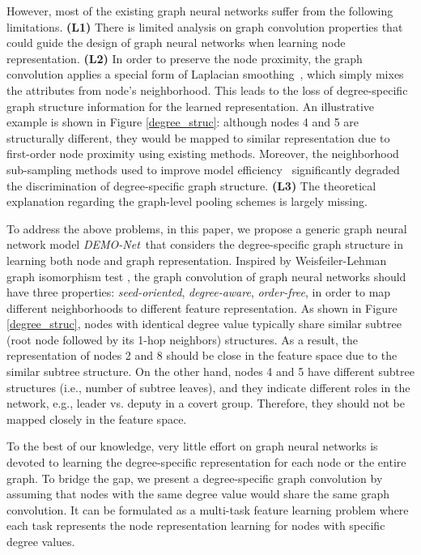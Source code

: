 \documentclass[sigconf]{acmart}
\newcommand{\demonet}{{\emph {DEMO-Net}}}
\begin{document}
However, most of the existing graph neural networks suffer from the following limitations.
\textbf{ (L1)} There is limited analysis on graph convolution properties that could guide the design of graph neural networks when learning node representation. \textbf{ (L2)} In order to preserve the node proximity, the graph convolution applies a special form of Laplacian smoothing~\cite{li2018deeper}, which simply mixes the attributes from node's neighborhood. This leads to the loss of degree-specific graph structure information for the learned representation. An illustrative example is shown in Figure \ref{degree_struc}: although nodes 4 and 5 are structurally different, they would be mapped to similar representation due to first-order node proximity using existing methods. Moreover, the neighborhood sub-sampling methods used to improve model efficiency~\cite{hamilton2017inductive} significantly degraded the discrimination of degree-specific graph structure. \textbf{ (L3)} The theoretical explanation regarding the graph-level pooling schemes is largely missing.

To address the above problems, in this paper, we propose a generic graph neural network model \demonet\ that considers the degree-specific graph structure in learning both node and graph representation. Inspired by Weisfeiler-Lehman graph isomorphism test \cite{weisfeiler1968reduction}, the graph convolution of graph neural networks should have three properties: {\em seed-oriented}, {\em degree-aware}, {\em order-free}, in order to map different neighborhoods to different feature representation. 
As shown in Figure \ref{degree_struc}, nodes with identical degree value typically share similar subtree (root node followed by its 1-hop neighbors) structures. As a result, the representation of nodes 2 and 8 should be close in the feature space due to the similar subtree structure. On the other hand, nodes 4 and 5 have different subtree structures (i.e., number of subtree leaves), and they indicate different roles in the network, e.g., leader vs. deputy in a covert group. Therefore, they should not be mapped closely in the feature space.

To the best of our knowledge, very little effort on graph neural networks is devoted to learning the degree-specific representation for each node or the entire graph. To bridge the gap, we present a degree-specific graph convolution by assuming that nodes with the same degree value would share the same graph convolution. It can be formulated as a multi-task feature learning problem where each task represents the node representation learning for nodes with specific degree values. 
\end{document}
